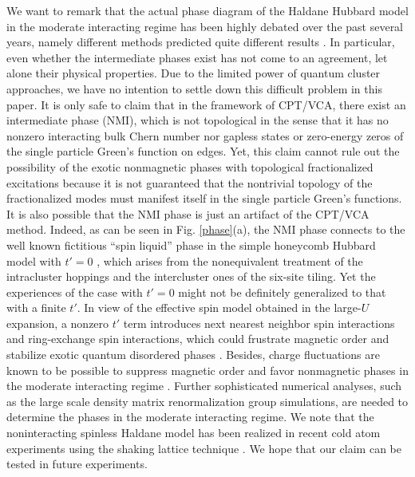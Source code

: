 \documentclass[12pt]{iopart}
\begin{document}
\par We want to remark that the actual phase diagram of the Haldane Hubbard model in the moderate interacting regime has been highly debated over the past several years, namely different methods predicted quite different results \cite{HZKL_PRB2011-1,HZKL_PRB2011-2,MR_PRB2013,HRP_PRB2015,ZSWZ_PRB2015,WFSM_PRB2016,HCPP_PRL2016,VSLTHT_PRL2016,IWT_PRB2016,ASHP_PRB2016,GJMP_PRB2016,GR_NJP2018,LTTNNH_PBCM2018}. In particular, even whether the intermediate phases exist has not come to an agreement, let alone their physical properties. Due to the limited power of quantum cluster approaches, we have no intention to settle down this difficult problem in this paper. It is only safe to claim that in the framework of CPT/VCA, there exist an intermediate phase (NMI), which is not topological in the sense that it has no nonzero interacting bulk Chern number nor gapless states or zero-energy zeros of the single particle Green's function on edges. Yet, this claim cannot rule out the possibility of the exotic nonmagnetic phases with topological fractionalized excitations \cite{HZKL_PRB2011-2,MR_PRB2013,HRP_PRB2015,HCPP_PRL2016} because it is not guaranteed that the nontrivial topology of the fractionalized modes must manifest itself in the single particle Green's functions. It is also possible that the NMI phase is just an artifact of the CPT/VCA method. Indeed, as can be seen in Fig. \ref{phase}(a), the NMI phase connects to the well known fictitious ``spin liquid'' phase in the simple honeycomb Hubbard model with $t'=0$ \cite{MLWAM_N2010,SOY_SR2012,AH_PRX2013,HD_PRL2013}, which arises from the nonequivalent treatment of the intracluster hoppings and the intercluster ones of the six-site tiling\cite{LRTR_PRB2014}. Yet the experiences of the case with $t'=0$ might not be definitely generalized to that with a finite $t'$. In view of the effective spin model obtained in the large-$U$ expansion, a nonzero $t'$ term introduces next nearest neighbor spin interactions and ring-exchange spin interactions, which could frustrate magnetic order and stabilize exotic quantum disordered phases \cite{HRP_PRB2015,HCPP_PRL2016}. Besides, charge fluctuations are known to be possible to suppress magnetic order and favor nonmagnetic phases in the moderate interacting regime \cite{SS_PRL2008,YKK_PRL2009,RLRT_PRL2015}. Further sophisticated numerical analyses, such as the large scale density matrix renormalization group simulations, are needed to determine the phases in the moderate interacting regime. We note that the noninteracting spinless Haldane model has been realized in recent cold atom experiments using the shaking lattice technique \cite{JMDRLUGE_N2014}. We hope that our claim can be tested in future experiments.
\end{document}
